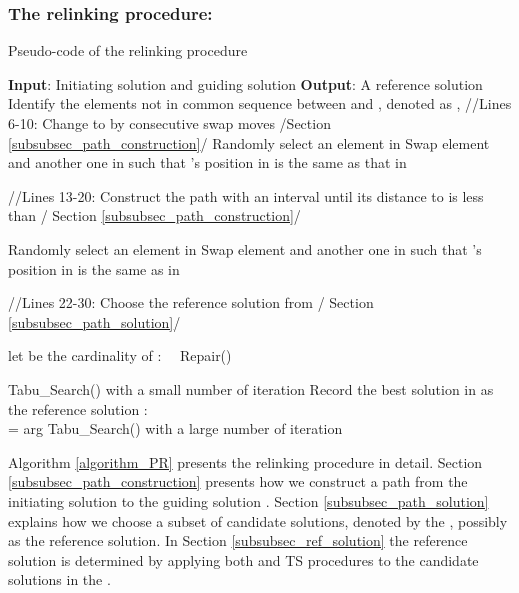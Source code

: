 \documentclass[authoryear,12pt]{elsarticle}
\begin{document}
\subsubsection{The relinking procedure:}
\label{subsubsec relinking}
\begin{algorithm}[!h]
\begin{scriptsize}
 \caption{Pseudo-code of the relinking procedure}\label{algorithm_PR}
 \begin{algorithmic}[1]
   \STATE \sf \textbf{Input}: Initiating solution  and guiding solution 
   \STATE \textbf{Output}: A reference solution 
   \STATE  Identify the elements not in common sequence between  and , denoted as 
   \STATE , 
   \STATE //Lines 6-10: Change  to  by  consecutive swap moves /Section \ref{subsubsec_path_construction}/
   \FOR{}
       \STATE  Randomly select an element   in 
       \STATE  Swap element  and another one in  such that 's position in  is the same as that in 
        \STATE     
   \ENDFOR

   \STATE 

   \STATE //Lines 13-20: Construct the path with an interval  until its distance to  is less than   / Section \ref{subsubsec_path_construction}/

   \WHILE{ }
        \FOR{}
       \STATE  Randomly select an element  in 
       \STATE  Swap element  and another one in  such that 's position in  is the same as in 
       \STATE     
       \ENDFOR
       \STATE 
   \ENDWHILE

   \STATE //Lines 22-30: Choose the reference solution from  \hfill  / Section \ref{subsubsec_path_solution}/

   \STATE let  be the cardinality of :\ \ 
   \FOR{, }
           \STATE     Repair()
        \ENDIF

       \STATE   Tabu\_Search() with a small number of iteration 
   \ENDFOR
   \STATE Record the best solution in  as the reference solution :\\
          = arg 
   \STATE   Tabu\_Search() with a large number of iteration 
   \RETURN 
 \end{algorithmic}
 \end{scriptsize}
\end{algorithm}

Algorithm \ref{algorithm_PR} presents the relinking procedure in detail. Section \ref{subsubsec_path_construction} presents how we construct a path from the initiating solution  to the guiding solution . Section \ref{subsubsec_path_solution} explains how we choose a subset of candidate solutions, denoted by the , possibly as the reference solution. In Section \ref{subsubsec_ref_solution} the reference solution is determined by applying both  and  TS procedures to the candidate solutions in the .
\end{document}
